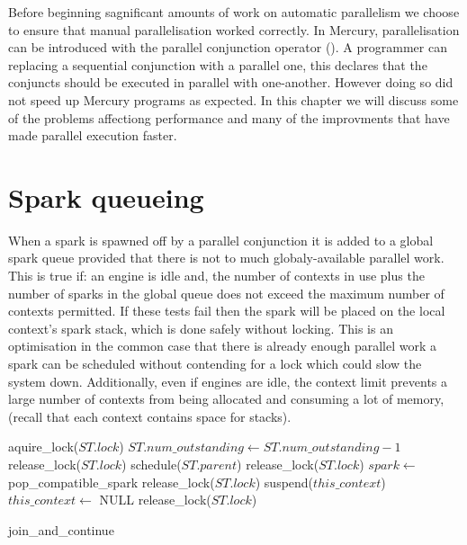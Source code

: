 

Before beginning sagnificant amounts of work on automatic parallelism we
choose to ensure that manual parallelisation worked correctly.
In Mercury, parallelisation can be introduced with the parallel conjunction
operator (\code{\&}).
A programmer can replacing a sequential conjunction with a parallel one,
this declares that the conjuncts should be executed in parallel with
one-another.
However doing so did not speed up Mercury programs as expected.
In this chapter we will discuss
some of the problems affectiong performance and
many of the improvments that have made parallel execution faster.

\section{Spark queueing}

When a spark is spawned off by a parallel conjunction
it is added to a global spark queue provided that there is not to much
globaly-available parallel work.
This is true if:
an engine is idle and,
the number of contexts in use plus the number of sparks in the global queue
does not exceed the maximum number of contexts permitted.
If these tests fail then the spark will be placed on the local context's
spark stack,
which is done safely without locking.
This is an optimisation in the common case that there is already enough
parallel work a spark can be scheduled without contending for a lock which
could slow the system down.
Additionally, even if engines are idle, the context limit prevents a large
number of contexts from being allocated and consuming a lot of memory,
(recall that each context contains space for stacks).

\begin{algorithm}
\begin{algorithmic}
  \State aquire\_lock($ST.lock$)
  \State $ST.num\_outstanding \gets ST.num\_outstanding - 1$
      \State release\_lock($ST.lock$)
    \Else
      \State schedule($ST.parent$)
      \State release\_lock($ST.lock$)
    \EndIf
  \Else
    \State $spark \gets$ pop\_compatible\_spark
       \State release\_lock($ST.lock$)
    \Else
         \State suspend($this\_context$)
         \State $this\_context \gets$ NULL
      \EndIf
      \State release\_lock($ST.lock$)
    \EndIf
  \EndIf
\EndProcedure
\end{algorithmic}
\caption{join\_and\_continue}
\label{alg:join_and_continue_peterw}
\end{algorithm}

